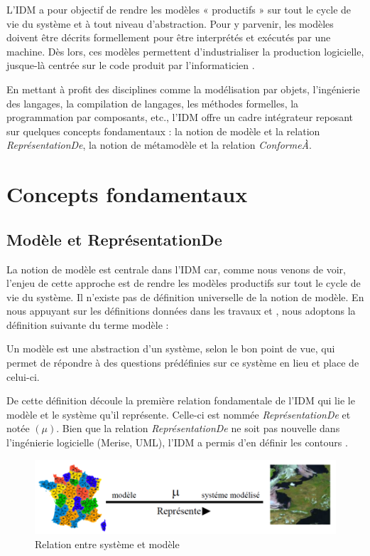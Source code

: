 L'IDM a pour objectif de rendre les modèles « productifs » sur tout le cycle de 
vie du système et à tout niveau d'abstraction. Pour y parvenir, les modèles 
doivent être décrits formellement pour être interprétés et exécutés par une 
machine. Dès lors, ces modèles permettent d'industrialiser la production 
logicielle, jusque-là centrée sur le code produit par l'informaticien 
\cite{bezivin2005unification}.

En mettant à profit des disciplines comme la modélisation par objets, 
l'ingénierie des langages, la compilation de langages, les méthodes formelles, 
la programmation par composants, etc., l'IDM offre un cadre intégrateur reposant 
sur quelques concepts fondamentaux : la notion de modèle et la relation 
\textit{ReprésentationDe}, la notion de métamodèle et la relation 
\textit{ConformeÀ}.

\section{Concepts fondamentaux}
\subsection{Modèle et ReprésentationDe}
La notion de modèle est centrale dans l'IDM car, comme nous venons de voir, 
l'enjeu de cette approche est de rendre les modèles productifs sur tout le cycle 
de vie du système. Il n'existe pas de définition universelle de la notion de 
modèle. En nous appuyant sur les définitions données dans les travaux 
\cite{minsky1967computation} \cite{bezivin2001towards} et 
\cite{seidewitz2003models}, nous adoptons la définition suivante du terme modèle 
:

\begin{definition}
Un modèle est une abstraction d'un système, selon le bon point de vue, qui 
permet de répondre à des questions prédéfinies sur ce système en lieu et place 
de celui-ci.
\end{definition}

De cette définition découle la première relation fondamentale de l'IDM qui lie 
le modèle et le système qu'il représente. Celle-ci est nommée 
\textit{ReprésentationDe} et notée $(\mu)$. Bien que la relation 
\textit{ReprésentationDe} ne soit pas nouvelle dans l'ingénierie logicielle 
(Merise, UML), l'IDM a permis d'en définir les contours \cite{atkinson2003model} 
\cite{seidewitz2003models} \cite{bezivin2004search}.

\begin{figure}[!htbp]
 \begin{center}
  \includegraphics[width=1\textwidth]{images/Chapitre1/favresystememodele.png}
 \end{center}
 \caption{Relation entre système et modèle \protect\cite{favre2006ingenierie}}
 \label{fig:systemModele}
\end{figure}

